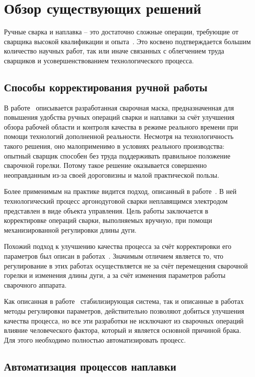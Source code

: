 \chapter{Обзор существующих решений}
Ручные сварка и наплавка -- это достаточно сложные операции, требующие от сварщика высокой квалификации и опыта~\cite{Hattori_1965, Seregina_2018}.
Это косвено подтверждается большим количество научных работ, так или иначе связанных с облегчением труда сварщиков и усовершенствованием технологического процесса.


\section{Способы корректирования ручной работы}
В работе~\cite{Aiteanu} описывается разработанная сварочная маска, предназначенная для повышения удобства ручных операций сварки и наплавки за счёт улучшения обзора рабочей области и контроля качества в режиме реального времени при помощи технологий дополненной реальности.
Несмотря на технологичность такого решения, оно малоприменимо в условиях реального производства: опытный сварщик способен без труда поддерживать правильное положение сварочной горелки.
Потому такое решение оказывается совершенно неоправданным из-за своей дороговизны и малой практической пользы.

Более применимым на практике видится подход, описанный в работе~\cite{Muller_2018}.
В ней технологический процесс аргонодуговой сварки неплавящимся электродом представлен в виде объекта управления.
Цель работы заключается в корректировке операций сварки, выполняемых вручную, при помощи механизированной регулировки длины дуги.

Похожий подход к улучшению качества процесса за счёт корректировки его параметров был описан в работах~\cite{Yang_2020, Dai_2011, Xu_2008}.
Значимым отличием является то, что регулирование в этих работах осуществляется не за счёт перемещения сварочной горелки и изменения длины дуги, а за счёт изменения параметров работы сварочного аппарата.

Как описанная в работе~\cite{Muller_2018} стабилизирующая система, так и описанные в работах~\cite{Yang_2020, Dai_2011, Xu_2008} методы регулировки параметров, действительно позволяют добиться улучшения качества процесса, но все эти разработки не исключают из сварочных операций влияние человеческого фактора, который и является основной причиной брака.
Для этого необходимо полностью автоматизировать процесс.


\section{Автоматизация процессов наплавки}


